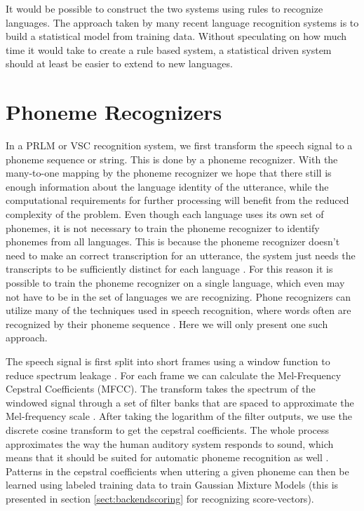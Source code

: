 It would be possible to construct the two systems using rules to recognize languages. The approach taken by many recent language recognition systems is to build a statistical model from training data. Without speculating on how much time it would take to create a rule based system, a statistical driven system should at least be easier to extend to new languages.


\section{Phoneme Recognizers}
\label{sect:phnrec}

In a PRLM or VSC recognition system, we first transform the speech signal to a phoneme sequence or string. This is done by a phoneme recognizer. With the many-to-one mapping by the phoneme recognizer we hope that there still is enough information about the language identity of the utterance, while the computational requirements for further processing will benefit from the reduced complexity of the problem. Even though each language uses its own set of phonemes, it is not necessary to train the phoneme recognizer to identify phonemes from all languages. This is because the phoneme recognizer doesn't need to make an correct transcription for an utterance, the system just needs the transcripts to be sufficiently distinct for each language \cite[p. 818]{lidbok}. For this reason it is possible to train the phoneme recognizer on a single language, which even may not have to be in the set of languages we are recognizing. Phone recognizers can utilize many of the techniques used in speech recognition,  where words often are recognized by their phoneme sequence \cite[p. 414]{talegk}. Here we will only present one such approach.

The speech signal is first split into short frames using a window function to reduce spectrum leakage \cite[p. 257]{talegk}. For each frame we can calculate the Mel-Frequency Cepstral Coefficients (MFCC). The transform takes the spectrum of the windowed signal through a set of filter banks that are spaced to approximate the Mel-frequency scale \cite[p. 314]{talegk}. After taking the logarithm of the filter outputs, we use the discrete cosine transform to get the cepstral coefficients. The whole process approximates the way the human auditory system responds to sound, which means that it should be suited for automatic phoneme recognition as well \cite[p. 314]{talegk}. Patterns in the cepstral coefficients when uttering a given phoneme can then be learned using labeled training data to train Gaussian Mixture Models (this is presented in section \ref{sect:backendscoring} for recognizing score-vectors).

